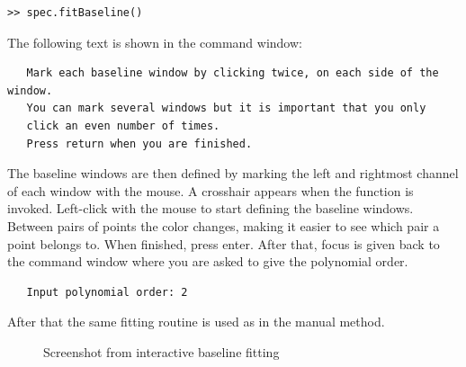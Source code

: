 \documentclass[11pt,a4paper]{article}
\begin{document}
\begin{lstlisting}
>> spec.fitBaseline()
\end{lstlisting}
\noindent
The following text is shown in the command window:

\begin{lstlisting}
   Mark each baseline window by clicking twice, on each side of the window.
   You can mark several windows but it is important that you only
   click an even number of times.
   Press return when you are finished.
\end{lstlisting}
\noindent
The baseline windows are then defined by marking the left and
rightmost channel of each window with the mouse. A crosshair appears
when the function is invoked. Left-click with the mouse to start
defining the baseline windows. Between pairs of points the color
changes, making it easier to see which pair a point belongs to. When
finished, press enter. After that, focus is given back to the command
window where you are asked to give the polynomial order. 

\begin{lstlisting}
   Input polynomial order: 2
\end{lstlisting}
\noindent
After that the same fitting routine is used as in the manual method. 

\begin{figure}[h!]
  \centering
  \caption{Screenshot from interactive baseline fitting}
  \label{fig:interbaseline}
\end{figure}
\end{document}
